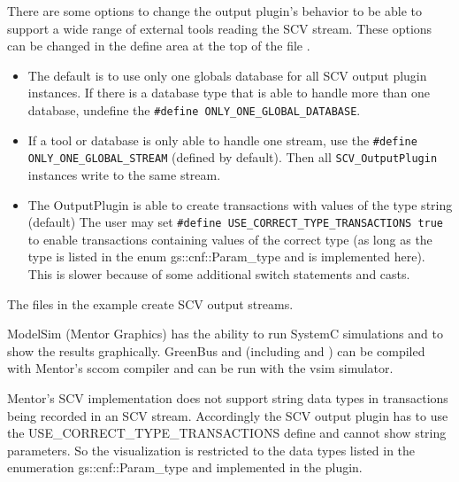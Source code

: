 There are some options to change the output plugin's behavior to be able to support a wide range of external tools reading the SCV stream. These options can be changed in the define area at the top of the file .

\begin{itemize}

  \item  The default is to use only one globals database for all SCV output plugin instances. If there is a database type that is able to handle more than one database, undefine the \newline
  \lstinline[language=TeX]|#define ONLY_ONE_GLOBAL_DATABASE|.

  \item  If a tool or database is only able to handle one stream, use the \lstinline[language=TeX]|#define ONLY_ONE_GLOBAL_STREAM| (defined by default). \newline
 Then all \lstinline|SCV_OutputPlugin| instances write to the same stream.

  \item  The OutputPlugin is able to create transactions with values of the type {\sffamily string} (default)
 The user may set \lstinline[language=TeX]|#define USE_CORRECT_TYPE_TRANSACTIONS true|
 to enable transactions containing values of the correct type (as long as the type is listed in the enum
 {\sffamily gs::cnf::Param\_type} and is implemented here). This is slower because of 
 some additional switch statements and casts.

\end{itemize}

The files  in the example  create SCV output streams.


{\sffamily ModelSim} (Mentor Graphics) has the ability to run SystemC simulations and to show the results graphically. GreenBus and \GreenControl (including \GreenConfig and \GreenAV) can be compiled with Mentor's {\sffamily sccom} compiler and can be run with the {\sffamily vsim} simulator.

Mentor's SCV implementation does not support string data types in transactions being recorded in an SCV stream. Accordingly the SCV output plugin has to use the {\sffamily \small USE\_CORRECT\_TYPE\_TRANSACTIONS} define and cannot show string parameters. So the visualization is restricted to the data types listed in the enumeration {\sffamily gs::cnf::Param\_type} and implemented in the plugin.

